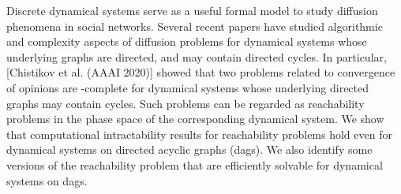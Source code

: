 Discrete dynamical systems serve as a
useful formal model to study diffusion phenomena in social networks.
Several recent papers have studied algorithmic and complexity aspects of
diffusion problems for dynamical systems whose underlying graphs
are directed, and may contain directed cycles.  In particular,
[Chistikov et al. (AAAI 2020)] showed that two problems related to
convergence of opinions are \cpsp-complete
for dynamical systems whose underlying directed graphs
may contain cycles. Such problems can be regarded as
reachability problems in the phase space of the corresponding
dynamical system. We show that computational intractability
results for reachability problems hold even for dynamical systems
on directed acyclic graphs (dags). We also identify some versions
of the reachability problem that are efficiently solvable for
dynamical systems on dags.
